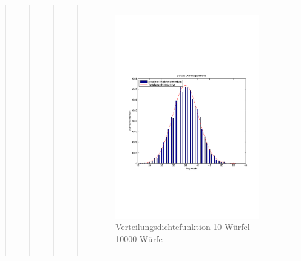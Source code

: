 \begin{quote}
\begin{quote}
\begin{quote}
\begin{quote}
            \begin{center}
            \begin{tabular}{ll}

            \hspace{-4em}
                \begin{minipage}{0.6\textwidth}

                    \begin{figure}[H]
                        \label{fig:}
                        \includegraphics[scale=0.3]{./Bilder/10wuerfelpdf} %
                        \caption{Verteilungsdichtefunktion 10 Würfel 10000 Würfe}
                    \end{figure}

                \end{minipage}
                \begin{minipage}{0.6\textwidth}


\end{minipage}
\end{tabular}
\end{center}
\end{quote}
\end{quote}
\end{quote}
\end{quote}
